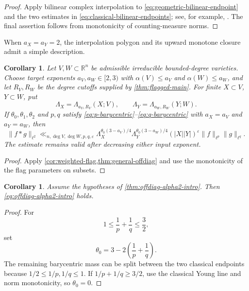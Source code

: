 \documentclass[11pt]{amsart}
\numberwithin{equation}{section}
\newtheorem{corollary}[theorem]{Corollary}
\theoremstyle{definition}
\theoremstyle{remark}
\newcommand{\R}{\mathbb R}
\newcommand{\eps}{\varepsilon}
\newcommand{\1}{\mathbf 1}
\newcommand{\card}[1]{\lvert #1\rvert}
\newcommand{\norm}[2][]{\lVert #2\rVert_{#1}}
\begin{document}
\begin{proof}
Apply bilinear complex interpolation to \eqref{eq:geometric-bilinear-endpoint} and the two estimates in \eqref{eq:classical-bilinear-endpoints}; see, for example, \cite{BerghLofstrom,Grafakos}.  The final assertion follows from monotonicity of counting-measure norms.
\end{proof}

When $a_X=a_Y=2$, the interpolation polygon and its upward monotone closure admit a simple description.


\begin{corollary}\label{cor:flagged-offdiag}
Let $V,W\subset\R^n$ be admissible irreducible bounded-degree varieties.  Choose target exponents $a_V,a_W\in[2,3)$ with $\alpha(V)\leq a_V$ and $\alpha(W)\leq a_W$, and let $R_V,R_W$ be the degree cutoffs supplied by \cref{thm:flagged-main}.  For finite $X\subset V$, $Y\subset W$, put
\[
 \Lambda_X=\Lambda_{a_V,R_V}(X;V),
 \qquad
 \Lambda_Y=\Lambda_{a_W,R_W}(Y;W).
\]
If $\theta_0,\theta_1,\theta_2$ and $p,q$ satisfy \eqref{eq:p-barycentric}--\eqref{eq:q-barycentric} with $a_X=a_V$ and $a_Y=a_W$, then
\begin{equation}\label{eq:flagged-offdiag}
 \norm[\ell^2]{f*g}
 \ll_{n,\deg V,\deg W,p,q,\eps}
 \Lambda_X^{\theta_0(3-a_V)/4}
 \Lambda_Y^{\theta_0(3-a_W)/4}
 (\card X\card Y)^\eps
 \norm[\ell^p]{f}\norm[\ell^q]{g}.
\end{equation}
The estimate remains valid after decreasing either input exponent.
\end{corollary}

\begin{proof}
Apply \cref{cor:weighted-flag,thm:general-offdiag} and use the monotonicity of the flag parameters on subsets.
\end{proof}

\begin{corollary}\label{cor:alpha2-offdiag}
Assume the hypotheses of \cref{thm:offdiag-alpha2-intro}.  Then \eqref{eq:offdiag-alpha2-intro} holds.
\end{corollary}

\begin{proof}
For
\[
 1\leq\frac1p+\frac1q\leq\frac32,
\]
set
\[
 \theta_0=3-2\left(\frac1p+\frac1q\right).
\]
The remaining barycentric mass can be split between the two classical endpoints because $1/2\leq1/p,1/q\leq1$.  If $1/p+1/q\geq3/2$, use the classical Young line and norm monotonicity, so $\theta_0=0$.
\end{proof}
\end{document}
